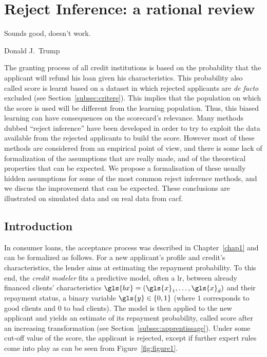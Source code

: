 
\chapter{Reject Inference: a rational review} \label{chap2}

\epigraph{Sounds good, doesn't work.}{Donald J.\ Trump}

\minitoc


\bigskip

The granting process of all credit institutions is based on the probability that the applicant will refund his loan given his characteristics. This probability also called \gls{score} is learnt based on a dataset in which rejected applicants are \textit{de facto} excluded (see Section~\ref{subsec:critere}). This implies that the population on which the \gls{score} is used will be different from the learning population. Thus, this biased learning can have consequences on the scorecard's relevance. Many methods dubbed ``reject inference'' have been developed in order to try to exploit the data available from the rejected applicants to build the score. However most of these methods are considered from an empirical point of view, and there is some lack of formalization of the assumptions that are really made, and of the theoretical properties that can be expected. We propose a formalisation of these usually hidden assumptions for some of the most common reject inference methods, and we discus the improvement that can be expected. These conclusions are illustrated on simulated data and on real data from \gls{cacf}.

\section{Introduction}

In consumer loans, the acceptance process was described in Chapter~\ref{chap1} and can be formalized as follows. For a new applicant's profile and credit's characteristics, the lender aims at estimating the repayment probability. To this end, the \textit{credit modeler} fits a predictive model, often a \gls{lr}, between already  financed  clients' characteristics $\gls{bx}=(\gls{x}_1,\ldots,\gls{x}_d)$ and their repayment status, a binary variable $\gls{y}\in\{0,1\}$ (where $1$ corresponds to good clients and $0$ to bad clients). The model is then applied to the new applicant and yields an estimate of its repayment probability, called \gls{score} after an increasing transformation (see Section~\ref{subsec:apprentissage}).
Under some cut-off value of the \gls{score}, the applicant is rejected, except if further expert rules come into play as can be seen from Figure~\ref{fig:figure1}.

